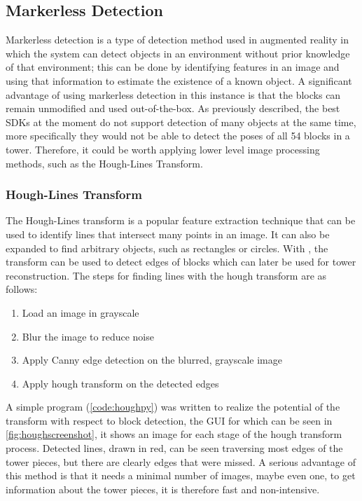 \subsection{Markerless Detection}\label{sec:markerless}

Markerless detection is a type of detection method used in augmented reality in which the system can detect objects in an environment without prior knowledge of that environment; this can be done by identifying features in an image and using that information to estimate the existence of a known object. A significant advantage of using markerless detection in this instance is that the \jenga{} blocks can remain unmodified and used out-of-the-box. As previously described, the best SDKs at the moment do not support detection of many objects at the same time, more specifically they would not be able to detect the poses of all 54 blocks in a tower. Therefore, it could be worth applying lower level image processing methods, such as the Hough-Lines Transform.

\subsubsection{Hough-Lines Transform}\label{subsec:hough}

The Hough-Lines transform \citep{houghpatent} is a popular feature extraction technique that can be used to identify lines that intersect many points in an image. It can also be expanded to find arbitrary objects, such as rectangles or circles. With \jenga{}, the transform can be used to detect edges of blocks which can later be used for tower reconstruction. The steps for finding lines with the hough transform are as follows:
\begin{enumerate}
    \item Load an image in grayscale
    \item Blur the image to reduce noise
    \item Apply Canny edge detection on the blurred, grayscale image
    \item Apply hough transform on the detected edges
\end{enumerate}

A simple program (\cref{code:houghpy}) was written to realize the potential of the transform with respect to block detection, the GUI for which can be seen in \cref{fig:houghscreenshot}, it shows an image for each stage of the hough transform process. Detected lines, drawn in red, can be seen traversing most edges of the tower pieces, but there are clearly edges that were missed. A serious advantage of this method is that it needs a minimal number of images, maybe even one, to get information about the tower pieces, it is therefore fast and non-intensive.

